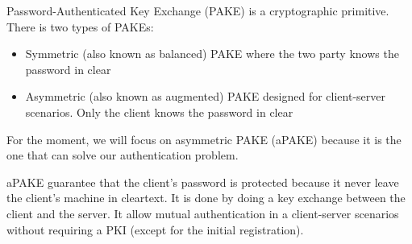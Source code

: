 \documentclass[../report.tex]{subfiles}
\begin{document}





Password-Authenticated Key Exchange (PAKE) is a cryptographic primitive. There is two types of PAKEs: 

\begin{itemize}
 \item Symmetric (also known as balanced) PAKE where the two party knows the password in clear
 \item Asymmetric (also known as augmented) PAKE designed for client-server scenarios. Only the client knows the password in clear
\end{itemize}

For the moment, we will focus on asymmetric PAKE (aPAKE) because it is the one that can solve our authentication problem.

aPAKE guarantee that the client's password is protected because it never leave the client's machine in cleartext.
It is done by doing a key exchange between the client and the server.
It allow mutual authentication in a client-server scenarios without requiring a PKI (except for the initial registration).
\end{document}
